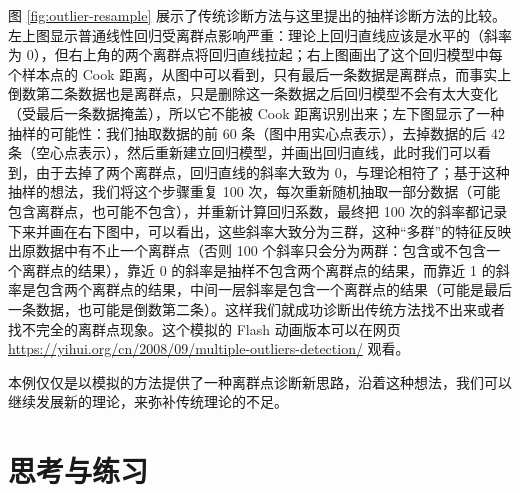\documentclass[
  b5paper,
  UTF8,twoside]{book}
\begin{document}
图 \ref{fig:outlier-resample} 展示了传统诊断方法与这里提出的抽样诊断方法的比较。左上图显示普通线性回归受离群点影响严重：理论上回归直线应该是水平的（斜率为 0），但右上角的两个离群点将回归直线拉起；右上图画出了这个回归模型中每个样本点的 Cook 距离，从图中可以看到，只有最后一条数据是离群点，而事实上倒数第二条数据也是离群点，只是删除这一条数据之后回归模型不会有太大变化（受最后一条数据掩盖），所以它不能被 Cook 距离识别出来；左下图显示了一种抽样的可能性：我们抽取数据的前 60 条（图中用实心点表示），去掉数据的后 42 条（空心点表示），然后重新建立回归模型，并画出回归直线，此时我们可以看到，由于去掉了两个离群点，回归直线的斜率大致为 0，与理论相符了；基于这种抽样的想法，我们将这个步骤重复 100 次，每次重新随机抽取一部分数据（可能包含离群点，也可能不包含），并重新计算回归系数，最终把 100 次的斜率都记录下来并画在右下图中，可以看出，这些斜率大致分为三群，这种``多群''的特征反映出原数据中有不止一个离群点（否则 100 个斜率只会分为两群：包含或不包含一个离群点的结果），靠近 0 的斜率是抽样不包含两个离群点的结果，而靠近 1 的斜率是包含两个离群点的结果，中间一层斜率是包含一个离群点的结果（可能是最后一条数据，也可能是倒数第二条）。这样我们就成功诊断出传统方法找不出来或者找不完全的离群点现象。这个模拟的 Flash 动画版本可以在网页 \url{https://yihui.org/cn/2008/09/multiple-outliers-detection/} 观看。

本例仅仅是以模拟的方法提供了一种离群点诊断新思路，沿着这种想法，我们可以继续发展新的理论，来弥补传统理论的不足。

\hypertarget{ux601dux8003ux4e0eux7ec3ux4e60-5}{%
\section{思考与练习}\label{ux601dux8003ux4e0eux7ec3ux4e60-5}}
\end{document}
